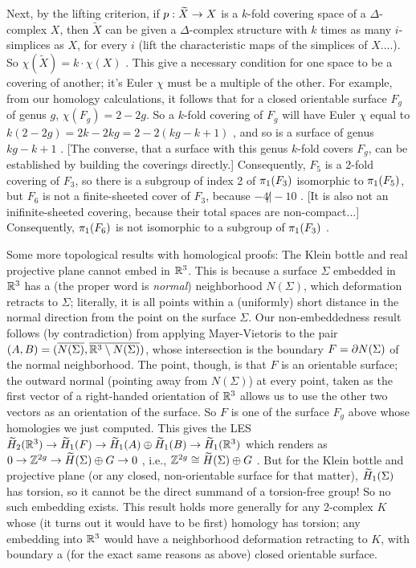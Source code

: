 \ssk

Next, by the lifting criterion, if $p:\widetilde{X}\rightarrow X$ is a $k$-fold covering space
of a $\Delta$-complex $X$,  then $\widetilde{X}$ can be given a $\Delta$-complex structure
with $k$ times as many $i$-simplices as $X$, for every $i$ (lift the characteristic maps
of the simplices of $X$....). So $\chi(\widetilde{X}) = k\cdot\chi(X)$ . This give a necessary
condition for one space to be a covering of another; it's Euler $\chi$ must be a multiple of the 
other. For example, from our homology calculations, it follows that for a closed orientable surface $F_g$ of 
genus $g$, $\chi(F_g)=2-2g$. So a $k$-fold covering of $F_g$ will have Euler $\chi$ equal to
$k(2-2g) = 2k-2kg = 2-2(kg-k+1)$ , and so is a surface of genus $kg-k+1$ . [The converse, that
a surface with this genus $k$-fold covers $F_g$, can be established by
building the coverings directly.] Consequently, $F_5$ is a 2-fold covering of $F_3$, 
so there is a subgroup of index 2 of $\pi_1(F_3)$ isomorphic to $\pi_1(F_5)$,  but $F_6$ is not a finite-sheeted
cover of $F_3$, because $-4\not | -10$ . [It is also not an inifinite-sheeted covering, because their
total spaces are non-compact...] Consequently, $\pi_1(F_6)$ is not isomorphic to a subgroup of $\pi_1(F_3)$ .

\bigskip

Some more topological results with homological proofs: The Klein bottle and real projective plane cannot 
embed in ${\Bbb R}^3$. This is because a surface $\Sigma$ embedded in ${\Bbb R}^3$ has a (the proper word is {\it normal})
neighborhood $N(\Sigma)$, which deformation retracts to $\Sigma$; literally, it is all points within a (uniformly) short distance
in the normal direction from the point on the surface $\Sigma$. Our non-embeddedness result follows (by contradiction)
from applying Mayer-Vietoris to the pair $(A,B) = (\overline{N(\Sigma)},\overline{{\Bbb R}^3\setminus N(\Sigma)})$, whose intersection
is the boundary $F=\partial N(\Sigma)$ of the normal neighborhood. The point, though, is that
$F$ is an orientable surface; the outward normal (pointing away from $N(\Sigma)$) at every point, taken as
the first vector of a right-handed orientation of ${\Bbb R}^3$ allows us to use the other two vectors as an 
orientation of the surface. So $F$ is one of the surface $F_g$ above whose homologies we just computed.
This gives the LES
\hhsk
$\widetilde{H}_2({\Bbb R}^3) \rightarrow \widetilde{H}_1(F) \rightarrow \widetilde{H}_1(A)\oplus \widetilde{H}_1(B)\rightarrow \widetilde{H}_1({\Bbb R} ^3)$
\hhsk 
which renders as 
\hhsk
$0\rightarrow{\Bbb Z}^{2g}\rightarrow \widetilde{H}(\Sigma)\oplus G\rightarrow 0$
\hhsk , i.e., \hhsk
${\Bbb Z}^{2g}\cong \widetilde{H}(\Sigma)\oplus G$ 
\hhsk . But for the Klein bottle and projective plane (or any closed, non-orientable
surface for that matter), $\widetilde{H}_1(\Sigma)$ has torsion, so it cannot be the direct
summand of a torsion-free group! So no such embedding exists. This result holds
more generally for any 2-complex $K$ whose (it turns out it would have to be first)
homology has torsion; any embedding into ${\Bbb R}^3$ would have a neighborhood 
deformation retracting to $K$, with boundary a (for the exact same reasons as above)
closed orientable surface.

